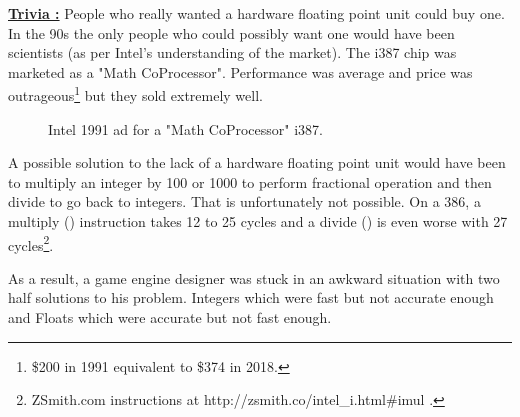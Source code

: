 \documentclass[book.tex]{subfiles}
\begin{document}
\textbf{\underline{Trivia :}} People who really wanted a hardware floating point unit could buy one. In the 90s the only people who could possibly want one would have been scientists (as per Intel's understanding of the market). The i387 chip was marketed as a "Math CoProcessor". Performance was average and price was outrageous\footnote{\$200 in 1991 equivalent to \$374 in 2018.} but they sold extremely well.\\
\begin{figure}[H]
\centering
  
  
\caption{Intel 1991 ad for a "Math CoProcessor" i387.}
\label{fig:fp_internals}
\end{figure}



\par
A possible solution to the lack of a hardware floating point unit would have been to multiply an integer by 100 or 1000 to perform fractional operation and then divide to go back to integers. That is unfortunately not possible. On a 386, a multiply () instruction takes 12 to 25 cycles and a divide () is even worse with 27 cycles\footnote{ZSmith.com instructions at http://zsmith.co/intel\_i.html\#imul .}.\\ 
\par
As a result, a game engine designer was stuck in an awkward situation with two half solutions to his problem. Integers which were fast but not accurate enough and Floats which were accurate but not fast enough.\\
\par
  
\end{document}

